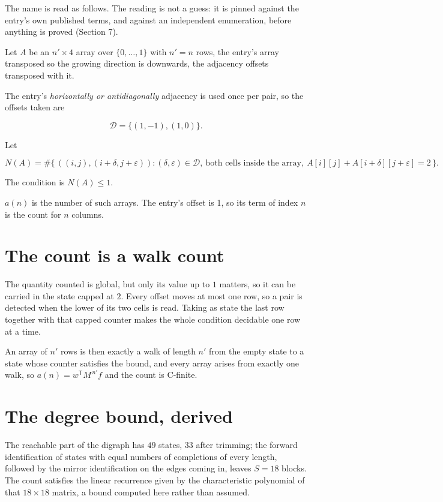\documentclass[11pt]{article}
\theoremstyle{definition}
\begin{document}
The name is read as follows. The reading is not a guess: it is pinned against the entry's own published terms, and against an independent enumeration, before anything is proved (Section 7).

Let $A$ be an $n' \times 4$ array over $\{0,\dots,1\}$ with $n' = n$ rows, the entry's array transposed so the growing direction is downwards, the adjacency offsets transposed with it.

The entry's {\itshape horizontally or antidiagonally} adjacency is used once per pair, so the offsets taken are

\[\mathcal{D} = \{(1,-1), (1,0)\}.\]

Let

\[N(A) = \#\bigl\{\,((i,j),(i{+}\delta,j{+}\varepsilon)) : (\delta,\varepsilon) \in \mathcal{D},\ \text{both cells inside the array},\ A[i][j] + A[i{+}\delta][j{+}\varepsilon] = 2\,\bigr\}.\]

The condition is $N(A) \le 1$.

$a(n)$ is the number of such arrays. The entry's offset is 1, so its term of index $n$ is the count for $n$ columns.

\section{The count is a walk count}

The quantity counted is global, but only its value up to $1$ matters, so it can be carried in the state capped at $2$. Every offset moves at most one row, so a pair is detected when the lower of its two cells is read. Taking as state the last row together with that capped counter makes the whole condition decidable one row at a time.

An array of $n'$ rows is then exactly a walk of length $n'$ from the empty state to a state whose counter satisfies the bound, and every array arises from exactly one walk, so $a(n) = w^{\mathsf T}M^{\,n'}f$ and the count is C-finite.

\section{The degree bound, derived}

The reachable part of the digraph has $49$ states, $33$ after trimming; the forward identification of states with equal numbers of completions of every length, followed by the mirror identification on the edges coming in, leaves $S = 18$ blocks. The count satisfies the linear recurrence given by the characteristic polynomial of that $18\times18$ matrix, a bound computed here rather than assumed.
\end{document}
